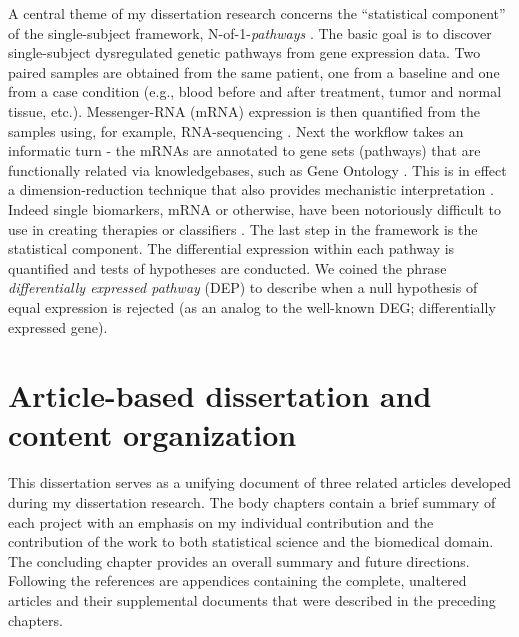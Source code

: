 \indent \indent A central theme of my dissertation research concerns the ``statistical component'' of the single-subject framework, N-of-1-\emph{pathways} \citep{Gardeux2014}. The basic goal is to discover single-subject dysregulated genetic pathways from gene expression data. Two paired samples are obtained from the same patient, one from a baseline and one from a case condition (e.g., blood before and after treatment, tumor and normal tissue, etc.). Messenger-RNA (mRNA) expression is then quantified from the samples using, for example, RNA-sequencing \citep{Wang2009}. Next the workflow takes an informatic turn - the mRNAs are annotated to gene sets (pathways) that are functionally related via knowledgebases, such as Gene Ontology \citep{Ashburner2000}. This is in effect a dimension-reduction technique that also provides mechanistic interpretation \citep{Mooney2015}. Indeed single biomarkers, mRNA or otherwise, have been notoriously difficult to use in creating therapies or classifiers \citep{Kern2012}. The last step in the framework is the statistical component. The differential expression within each pathway is quantified and tests of hypotheses are conducted. We coined the phrase \emph{differentially expressed pathway} (DEP) to describe when a null hypothesis of equal expression is rejected (as an analog to the well-known DEG; differentially expressed gene). 

\section{Article-based dissertation and content organization}\label{sec:org}
\indent \indent This dissertation serves as a unifying document of three related articles developed during my dissertation research. The body chapters contain a brief summary of each project with an emphasis on my individual contribution and the contribution of the work to both statistical science and the biomedical domain. The concluding chapter provides an overall summary and future directions. Following the references are appendices containing the complete, unaltered articles and their supplemental documents that were described in the preceding chapters.
